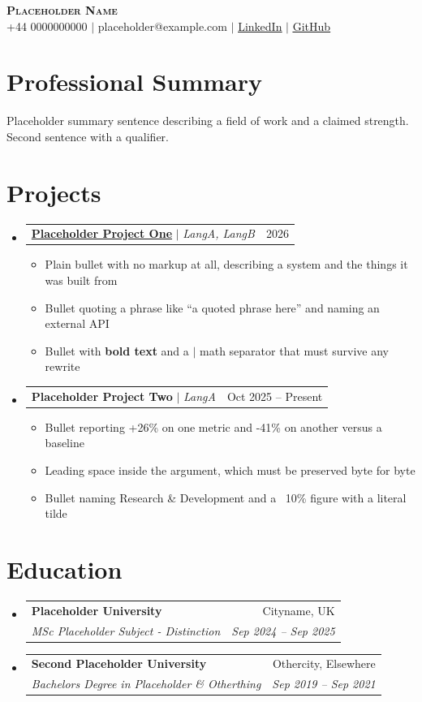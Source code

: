 \documentclass[letterpaper,11pt]{article}
\makeatletter
\newcommand{\resumeItem}[1]{
  \item\small{
    {#1 \vspace{-2pt}}
  }
}
\newcommand{\resumeSubheading}[4]{
  \vspace{-2pt}\item
    \begin{tabular*}{0.97\textwidth}[t]{l@{\extracolsep{\fill}}r}
      \textbf{#1} & #2 \\
      \textit{\small#3} & \textit{\small #4} \\
    \end{tabular*}\vspace{-7pt}
}
\newcommand{\resumeProjectHeading}[2]{
    \item
    \begin{tabular*}{0.97\textwidth}{l@{\extracolsep{\fill}}r}
      \small#1 & #2 \\
    \end{tabular*}\vspace{-7pt}
}
\newcommand{\resumeSubHeadingListStart}{\begin{itemize}[leftmargin=0.15in, label={}]}
\newcommand{\resumeSubHeadingListEnd}{\end{itemize}}
\newcommand{\resumeItemListStart}{\begin{itemize}}
\newcommand{\resumeItemListEnd}{\end{itemize}\vspace{-5pt}}
\makeatother
\begin{document}
\begin{center}
    \textbf{\Huge \scshape Placeholder Name} \\ \vspace{1pt}
    \small +44 0000000000 $|$ {\small{placeholder@example.com}} $|$ 
    \href{https://www.linkedin.com/in/placeholder/}{\underline{LinkedIn}} $|$
    \href{https://github.com/placeholder}{\underline{GitHub}}
\end{center}
\section{Professional Summary}
\small{
Placeholder summary sentence describing a field of work and a claimed strength. Second sentence with a qualifier.
}

\section{Projects}
    \resumeSubHeadingListStart
  \resumeProjectHeading
    {\textbf{\href{https://example.com}{Placeholder Project One}} $|$ \emph{LangA, LangB}}{2026}
    \resumeItemListStart
      \resumeItem{Plain bullet with no markup at all, describing a system and the things it was built from}
      \resumeItem{Bullet quoting a phrase like ``a quoted phrase here'' and naming an external API}
      \resumeItem{Bullet with \textbf{bold text} and a $|$ math separator that must survive any rewrite}
    \resumeItemListEnd
    
        \resumeProjectHeading
              {\textbf{Placeholder Project Two} $|$ \emph{LangA}}{Oct 2025 -- Present}
              \resumeItemListStart
                \resumeItem{Bullet reporting +26\% on one metric and -41\% on another versus a baseline}
                \resumeItem{ Leading space inside the argument, which must be preserved byte for byte}
                \resumeItem{Bullet naming Research \& Development and a ~10\% figure with a literal tilde}
              \resumeItemListEnd

    \resumeSubHeadingListEnd
\section{Education}
  \resumeSubHeadingListStart
    \resumeSubheading
      {Placeholder University}{Cityname, UK}
      {MSc Placeholder Subject - Distinction}{Sep 2024 -- Sep 2025}
      \resumeSubheading
      {Second Placeholder University}{Othercity, Elsewhere}
      {Bachelors Degree in Placeholder \& Otherthing}{Sep 2019 -- Sep 2021}
  \resumeSubHeadingListEnd
\end{document}
